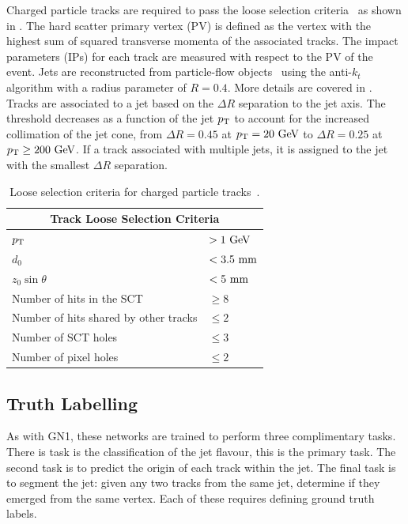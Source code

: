 Charged particle tracks are required to pass the loose selection criteria~\cite{TrackLoose} as shown in .
The hard scatter primary vertex (PV) is defined as the vertex with the highest sum of squared transverse momenta of the associated tracks.
The impact parameters (IPs) for each track are measured with respect to the PV of the event.
Jets are reconstructed from particle-flow objects~\cite{PFlow} using the anti-$k_t$ algorithm with a radius parameter of $R = 0.4$.
More details are covered in .
Tracks are associated to a jet based on the $\Delta R$ separation to the jet axis.
The threshold decreases as a function of the jet $p_{\text{T}}$ to account for the increased collimation of the jet cone, from $\Delta R = 0.45$ at $\pt = 20~\GeV$ to $\Delta R = 0.25$ at $\pt \geq 200~\GeV$.
If a track associated with multiple jets, it is assigned to the jet with the smallest $\Delta R$ separation.

\begin{table}
    \centering
    \begin{tabular}{ll}
        \toprule
        \midrule
        \multicolumn{2}{c}{Track Loose Selection Criteria} \\
        \midrule
        $p_{\text{T}}$ & $> 1~\GeV$ \\
        $d_0$ & $< 3.5~\mm$ \\
        $z_0 \sin \theta$ & $< 5~\mm$ \\
        Number of hits in the SCT & $\geq 8$ \\
        Number of hits shared by other tracks & $\leq 2$ \\
        Number of SCT holes & $\leq 3$ \\
        Number of pixel holes & $\leq 2$ \\
        \bottomrule
    \end{tabular}
    \caption{Loose selection criteria for charged particle tracks~\cite{TrackLoose}.}
    \label{tab:track_loose}
\end{table}

\subsection{Truth Labelling}

As with GN1, these networks are trained to perform three complimentary tasks.
There is task is the classification of the jet flavour, this is the primary task.
The second task is to predict the origin of each track within the jet.
The final task is to segment the jet: given any two tracks from the same jet, determine if they emerged from the same vertex.
Each of these requires defining ground truth labels.

